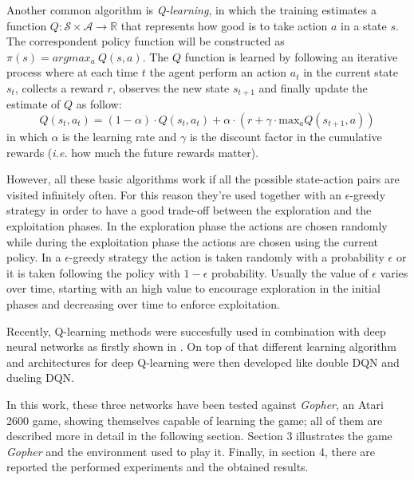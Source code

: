 \documentclass[article,11pt]{article}
\begin{document}
	Another common algorithm is \textit{Q-learning}, in which the training estimates a function $Q: \mathcal{S}\times\mathcal{A}\to\mathbb{R}$ that represents how good is to take action $a$ in a state $s$. The correspondent policy function will be constructed as $\pi(s) = argmax_{a}\ Q(s, a)$. The $Q$ function is learned by following an iterative process where at each time $t$ the agent perform an action $a_t$ in the current state $s_t$, collects a reward $r$, observes the new state $s_{t+1}$ and finally update the estimate of $Q$ as follow:
	\begin{equation}
		\label{eq:qlearning}
		Q(s_t, a_t) = (1-\alpha)\cdot Q(s_t, a_t) + \alpha \cdot (r + \gamma\cdot \text{max}_aQ(s_{t+1}, a))
	\end{equation}
	in which $\alpha$ is the learning rate and $\gamma$ is the discount factor in the cumulative rewards (\textit{i.e.} how much the future rewards matter).
	
	However, all these basic algorithms work if all the possible state-action pairs are visited infinitely often. For this reason they're used together with an $\epsilon$-greedy strategy in order to have a good trade-off between the exploration and the exploitation phases. In the exploration phase the actions are chosen randomly while during the exploitation phase the actions are chosen using the current policy. In a $\epsilon$-greedy strategy the action is taken randomly with a probability $\epsilon$ or it is taken following the policy with $1-\epsilon$ probability. Usually the value of $\epsilon$ varies over time, starting with an high value to encourage exploration in the initial phases and decreasing over time to enforce exploitation.
	
	Recently, Q-learning methods were succesfully used in combination with deep neural networks as firstly shown in \cite{dqn2013}. On top of that different learning algorithm and architectures for deep Q-learning were then developed like double DQN\cite{doubledqn} and dueling DQN\cite{duelingdqn}.
	
	In this work, these three networks have been tested against \textit{Gopher}, an Atari 2600 game, showing themselves capable of learning the game; all of them are described more in detail in the following section. 
	Section 3 illustrates the game \textit{Gopher} and the environment used to play it. Finally, in section 4, there are reported the  performed experiments and the obtained results.
	
\end{document}
